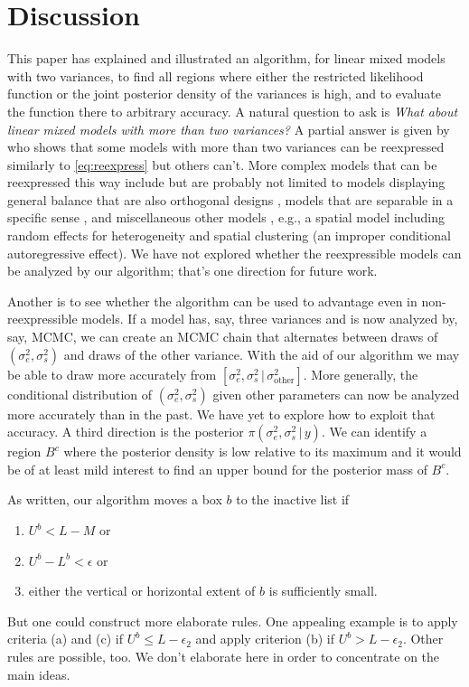 \documentclass{report}
\newcommand{\sigssq}{\sigma_s^2}
\newcommand{\sigesq}{\sigma_e^2}
\newcommand{\g}{\,|\,}
\begin{document}
\section{Discussion}
This paper has explained and illustrated an algorithm, for linear mixed models with two variances, to find all regions where either the restricted likelihood function or the joint posterior density of the variances is high, and to evaluate the function there to arbitrary accuracy.  A natural question to ask is \emph{What about linear mixed models with more than two variances?}  A partial answer is given by \cite{hodges:2013} who shows that some models with more than two variances can be reexpressed similarly to \eqref{eq:reexpress} but others can't.  More complex models that can be reexpressed this way include but are probably not limited to models displaying general balance that are also orthogonal designs \citep[all balanced ANOVAs plus other models;][]{houtman_speed:1983}, models that are separable in a specific sense \citep[Section 17.1.5]{hodges:2013}, and miscellaneous other models \citep[Section 17.1.5]{hodges:2013}, e.g., a spatial model including random effects for heterogeneity and spatial clustering (an improper conditional autoregressive effect). We have not explored whether the reexpressible models can be analyzed by our algorithm; that's one direction for future work.  

Another is to see whether the algorithm can be used to advantage even in non-reexpressible models.  If a model has, say, three variances and is now analyzed by, say, MCMC, we can create an MCMC chain that alternates between draws of $(\sigesq,\sigssq)$ and draws of the other variance.  With the aid of our algorithm we may be able to draw more accurately from $[\sigesq,\sigssq\g \sigma^2_\text{other}]$.  More generally, the conditional distribution of $(\sigesq,\sigssq)$ given other parameters can now be analyzed more accurately than in the past.  We have yet to explore how to exploit that accuracy.  A third direction is the posterior $\pi(\sigesq,\sigssq\g y)$.  We can identify a region $B^c$ where the posterior density is low relative to its maximum and it would be of at least mild interest to find an upper bound for the posterior mass of $B^c$.

As written, our algorithm moves a box $b$ to the inactive list if
\begin{enumerate}[label=(\alph*)]
\item $U^b < L-M$ or
\item $U^b - L^b < \epsilon$ or
\item either the vertical or horizontal extent of $b$ is sufficiently small.
\end{enumerate}
But one could construct more elaborate rules.  One appealing example is to apply criteria (a) and (c) if $U^b \le L-\epsilon_2$ and apply criterion (b) if $U^b > L-\epsilon_2$.  Other rules are possible, too.  We don't elaborate here in order to concentrate on the main ideas.
\end{document}
